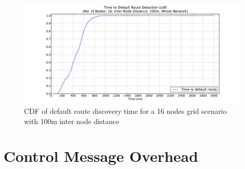 \begin{figure}[htbp]
  \begin{center}
  \hspace{-20pt}
    \leavevmode
      \includegraphics[width=\textwidth]
      {Pics/results/16/MRHOF/grid/dist100_montecarlo_cdf_hist.pdf}
   \caption{CDF of default route discovery time for a 16 nodes grid scenario with 100m inter node distance}
   \end{center}
   \vspace{-10pt}
\end{figure}

\newpage
\section{Control Message Overhead}
\label{Appx:icmp}

